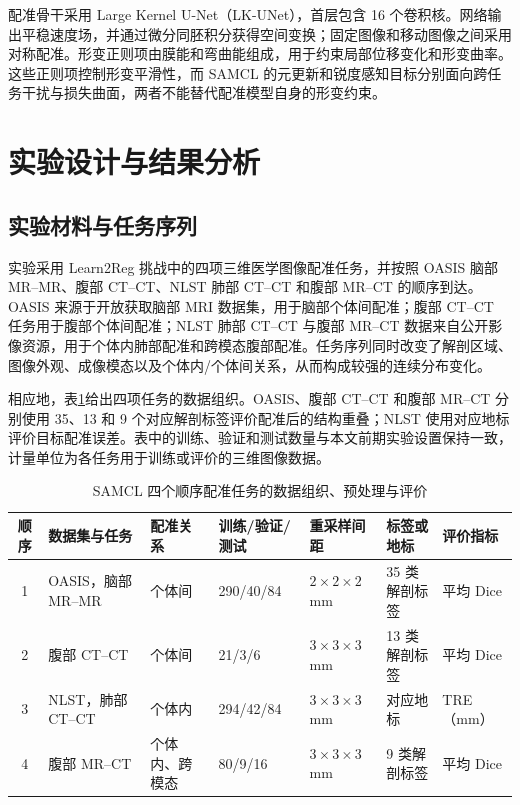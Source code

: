 配准骨干采用 Large Kernel U-Net（LK-UNet），首层包含 16 个卷积核\cite{jia2022lkunet}。网络输出平稳速度场，并通过微分同胚积分获得空间变换；固定图像和移动图像之间采用对称配准。形变正则项由膜能和弯曲能组成，用于约束局部位移变化和形变曲率\cite{ashburner2007diffeomorphic}。这些正则项控制形变平滑性，而 SAMCL 的元更新和锐度感知目标分别面向跨任务干扰与损失曲面，两者不能替代配准模型自身的形变约束。

\section{实验设计与结果分析}
\label{sec:registration-experiments}

\subsection{实验材料与任务序列}
\label{subsubsec:samcl-materials}

实验采用 Learn2Reg 挑战中的四项三维医学图像配准任务，并按照 OASIS 脑部 MR--MR、腹部 CT--CT、NLST 肺部 CT--CT 和腹部 MR--CT 的顺序到达\cite{hering2021learn2reg}。OASIS 来源于开放获取脑部 MRI 数据集，用于脑部个体间配准\cite{marcus2007oasis}；腹部 CT--CT 任务用于腹部个体间配准\cite{xu2016abdomenreg}；NLST 肺部 CT--CT 与腹部 MR--CT 数据来自公开影像资源，用于个体内肺部配准和跨模态腹部配准\cite{clark2013tcia,xu2016abdomenreg}。任务序列同时改变了解剖区域、图像外观、成像模态以及个体内/个体间关系，从而构成较强的连续分布变化。

相应地，表\ref{tab:samcl-datasets}给出四项任务的数据组织。OASIS、腹部 CT--CT 和腹部 MR--CT 分别使用 35、13 和 9 个对应解剖标签评价配准后的结构重叠；NLST 使用对应地标评价目标配准误差。表中的训练、验证和测试数量与本文前期实验设置保持一致\cite{wang2024samcl}，计量单位为各任务用于训练或评价的三维图像数据。

\begin{table}[htbp]
\centering
\caption{SAMCL 四个顺序配准任务的数据组织、预处理与评价}
\label{tab:samcl-datasets}
\thesistablefont
\renewcommand{\arraystretch}{1.14}
\setlength{\tabcolsep}{3pt}
\begin{tabularx}{\textwidth}{@{}cXp{1.8cm}p{2.35cm}p{1.65cm}p{2.0cm}p{1.5cm}@{}}
\toprule
顺序 & 数据集与任务 & 配准关系 & 训练/验证/测试 & 重采样间距 & 标签或地标 & 评价指标 \\
\midrule
1 & OASIS，脑部 MR--MR & 个体间 & 290/40/84 & $2\times2\times2$ mm & 35 类解剖标签 & 平均 Dice \\
2 & 腹部 CT--CT & 个体间 & 21/3/6 & $3\times3\times3$ mm & 13 类解剖标签 & 平均 Dice \\
3 & NLST，肺部 CT--CT & 个体内 & 294/42/84 & $3\times3\times3$ mm & 对应地标 & TRE（mm） \\
4 & 腹部 MR--CT & 个体内、跨模态 & 80/9/16 & $3\times3\times3$ mm & 9 类解剖标签 & 平均 Dice \\
\bottomrule
\end{tabularx}
\end{table}

